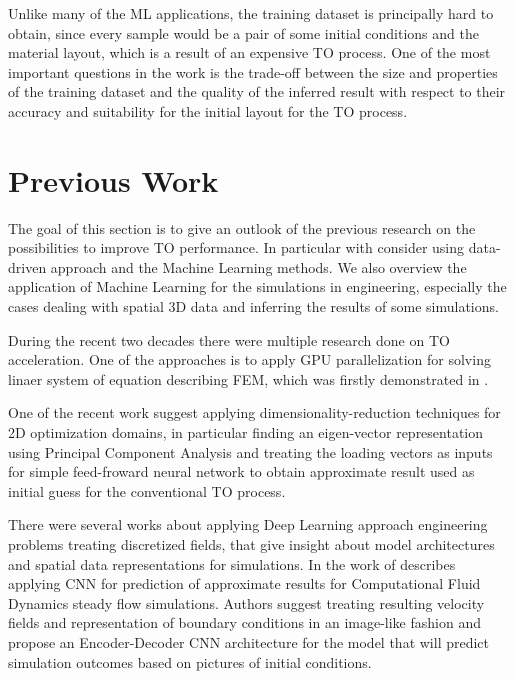 Unlike many of the ML applications, the training dataset is principally hard to obtain, since every sample would be a pair of some initial conditions and the material layout, which is a result of an expensive TO process. 
One of the most important questions in the work is the trade-off between the size and properties of the training dataset and the quality of the inferred result with respect to their accuracy and suitability for the initial layout for the TO process.


\section{Previous Work}

The goal of this section is to give an outlook of the previous research on the possibilities to improve TO performance.
In particular with consider using data-driven approach and the Machine Learning methods.
We also overview the application of Machine Learning for the simulations in engineering, especially the cases dealing with spatial 3D data and inferring the results of some simulations.
\medskip

During the recent two decades there were multiple research done on TO acceleration.
One of the approaches is to apply GPU parallelization for solving linaer system of equation describing FEM, which was firstly demonstrated in \cite{}.

One of the recent work \cite{bibl:prevwork_pca} suggest applying dimensionality-reduction techniques for 2D optimization domains, in particular finding an eigen-vector representation using Principal Component Analysis\cite{} and treating the loading vectors as inputs for simple feed-froward neural network to obtain approximate result used as initial guess for the conventional TO process.
\medskip

There were several works about applying Deep Learning approach engineering problems treating discretized fields, that give insight about model architectures and spatial data representations for simulations. 
In the work of \cite{prev:prevwork_cnncfd} describes applying CNN for prediction of approximate results for Computational Fluid Dynamics steady flow simulations. 
Authors suggest treating resulting velocity fields and representation of boundary conditions in an image-like fashion and propose an Encoder-Decoder CNN architecture for the model that will predict simulation outcomes based on pictures of initial conditions.




